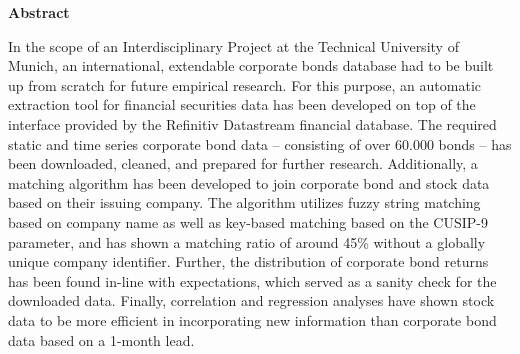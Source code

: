 
{}	

\vspace*{2cm}
\begin{center}
{\Large \bf Abstract}
\end{center}
\vspace{1cm}

In the scope of an Interdisciplinary Project at the Technical University of Munich, an international, extendable corporate bonds database had to be built up from scratch for future empirical research. For this purpose, an automatic extraction tool for financial securities data has been developed on top of the interface provided by the Refinitiv Datastream financial database. The required static and time series corporate bond data -- consisting of over 60.000 bonds -- has been downloaded, cleaned, and prepared for further research. Additionally, a matching algorithm has been developed to join corporate bond and stock data based on their issuing company. The algorithm utilizes fuzzy string matching based on company name as well as key-based matching based on the CUSIP-9 parameter, and has shown a matching ratio of around 45\% without a globally unique company identifier. Further, the distribution of corporate bond returns has been found in-line with expectations, which served as a sanity check for the downloaded data. Finally, correlation and regression analyses have shown stock data to be more efficient in incorporating new information than corporate bond data based on a 1-month lead. 
